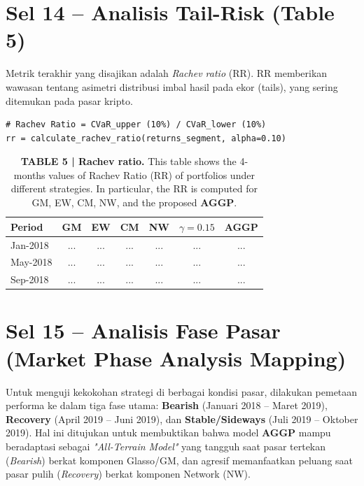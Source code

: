 \documentclass[12pt,a4paper]{article}
\begin{document}
\section{Sel 14 -- Analisis Tail-Risk (Table 5)}
Metrik terakhir yang disajikan adalah \textit{Rachev ratio} (RR). RR memberikan wawasan tentang asimetri distribusi imbal hasil pada ekor (tails), yang sering ditemukan pada pasar kripto.

\begin{lstlisting}[caption={Kalkulasi Rachev Ratio Periodik}]
# Rachev Ratio = CVaR_upper (10%) / CVaR_lower (10%)
rr = calculate_rachev_ratio(returns_segment, alpha=0.10)
\end{lstlisting}

\begin{table}[h]
    \centering
    \footnotesize
    \caption{\textbf{TABLE 5 | Rachev ratio.} This table shows the 4-months values of Rachev Ratio (RR) of portfolios under different strategies. In particular, the RR is computed for GM, EW, CM, NW, and the proposed \textbf{AGGP}.}
    \begin{tabular}{lcccccc}
        \toprule
        Period & GM & EW & CM & NW & $\gamma=0.15$ & AGGP \\
        \midrule
        Jan-2018 & ... & ... & ... & ... & ... & ... \\
        May-2018 & ... & ... & ... & ... & ... & ... \\
        Sep-2018 & ... & ... & ... & ... & ... & ... \\
        \bottomrule
    \end{tabular}
\end{table}

\section{Sel 15 -- Analisis Fase Pasar (Market Phase Analysis Mapping)}
Untuk menguji kekokohan strategi di berbagai kondisi pasar, dilakukan pemetaan performa ke dalam tiga fase utama: \textbf{Bearish} (Januari 2018 -- Maret 2019), \textbf{Recovery} (April 2019 -- Juni 2019), dan \textbf{Stable/Sideways} (Juli 2019 -- Oktober 2019). Hal ini ditujukan untuk membuktikan bahwa model \textbf{AGGP} mampu beradaptasi sebagai \textit{"All-Terrain Model"} yang tangguh saat pasar tertekan (\textit{Bearish}) berkat komponen Glasso/GM, dan agresif memanfaatkan peluang saat pasar pulih (\textit{Recovery}) berkat komponen Network (NW).
\end{document}
